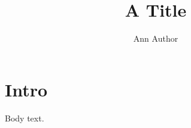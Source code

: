 \documentclass[doc]{apa}
\title{A Title}
\author{Ann Author}
\affiliation{Some University}
\begin{document}
\maketitle
\section{Intro}
Body text.
\end{document}
